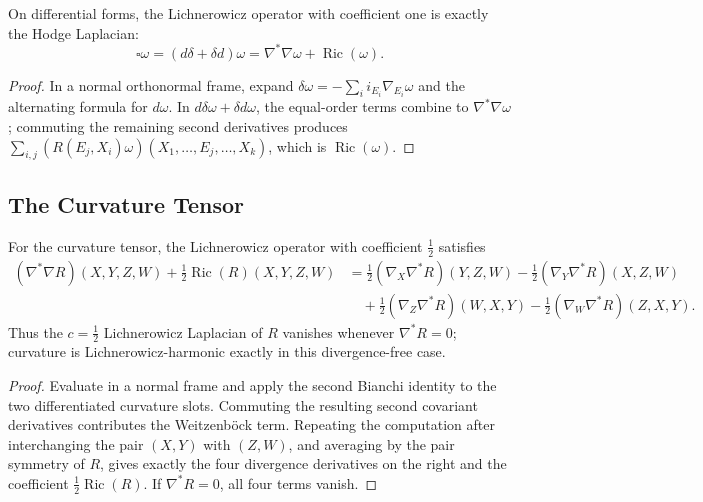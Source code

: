 \begin{theorem}
  \label{thm:pet-ch9-weitzenbock-hodge-laplacian}
  On differential forms, the Lichnerowicz operator with coefficient one is
  exactly the Hodge Laplacian:
  \[
    \square\omega=(d\delta+\delta d)\omega=\nabla^*\nabla\omega+\operatorname{Ric}(\omega).
  \]
\end{theorem}
\begin{proof}
  \sketch
  In a normal orthonormal frame, expand
  \(\delta\omega=-\sum_i i_{E_i}\nabla_{E_i}\omega\) and the alternating
  formula for \(d\omega\).  In \(d\delta\omega+\delta d\omega\), the equal-order
  terms combine to \(\nabla^*\nabla\omega\); commuting the remaining second
  derivatives produces
  \(\sum_{i,j}(R(E_j,X_i)\omega)(X_1,\ldots,E_j,\ldots,X_k)\), which is
  \(\operatorname{Ric}(\omega)\).
\end{proof}

\subsection{The Curvature Tensor}

\begin{theorem}
  \label{thm:pet-ch9-curvature-tensor-lichnerowicz}
  For the curvature tensor, the Lichnerowicz operator with coefficient
  $\tfrac12$ satisfies
  \begin{align*}
    (\nabla^*\nabla R)(X,Y,Z,W)+\tfrac12\operatorname{Ric}(R)(X,Y,Z,W)
    &=\tfrac12(\nabla_X\nabla^*R)(Y,Z,W)-\tfrac12(\nabla_Y\nabla^*R)(X,Z,W)\\
    &\quad+\tfrac12(\nabla_Z\nabla^*R)(W,X,Y)-\tfrac12(\nabla_W\nabla^*R)(Z,X,Y).
  \end{align*}
  Thus the $c=\tfrac12$ Lichnerowicz Laplacian of $R$ vanishes whenever
  $\nabla^*R=0$; curvature is Lichnerowicz-harmonic exactly in this
  divergence-free case.
\end{theorem}
\begin{proof}
  \sketch
  Evaluate in a normal frame and apply the second Bianchi identity to the two
  differentiated curvature slots.  Commuting the resulting second covariant
  derivatives contributes the Weitzenb\"ock term.  Repeating the computation
  after interchanging the pair \((X,Y)\) with \((Z,W)\), and averaging by the
  pair symmetry of \(R\), gives exactly the four divergence derivatives on
  the right and the coefficient \(\tfrac12\operatorname{Ric}(R)\).  If
  \(\nabla^*R=0\), all four terms vanish.
\end{proof}

